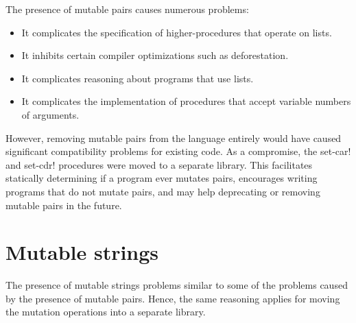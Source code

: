 \documentclass[twoside,twocolumn]{algol60}
\begin{document}
The presence of mutable pairs causes numerous problems:
%
\begin{itemize}
\item It complicates the specification of higher-procedures that
  operate on lists.
\item It inhibits certain compiler optimizations such as
  deforestation.
\item It complicates reasoning about programs that use lists.
\item It complicates the implementation of procedures that accept
  variable numbers of arguments.
\end{itemize}
%
However, removing mutable pairs from the language entirely would have
caused significant compatibility problems for existing code.  As a
compromise, the {\cf set-car!} and {\cf set-cdr!} procedures were
moved to a separate library.  This facilitates statically determining
if a program ever mutates pairs, encourages writing programs that do
not mutate pairs, and may help deprecating or removing mutable pairs
in the future.

\chapter{Mutable strings}

The presence of mutable strings problems similar to some of the
problems caused by the presence of mutable pairs.  Hence, the same
reasoning applies for moving the mutation operations into a separate
library.


\renewcommand{\bibname}{References}



\end{document}
